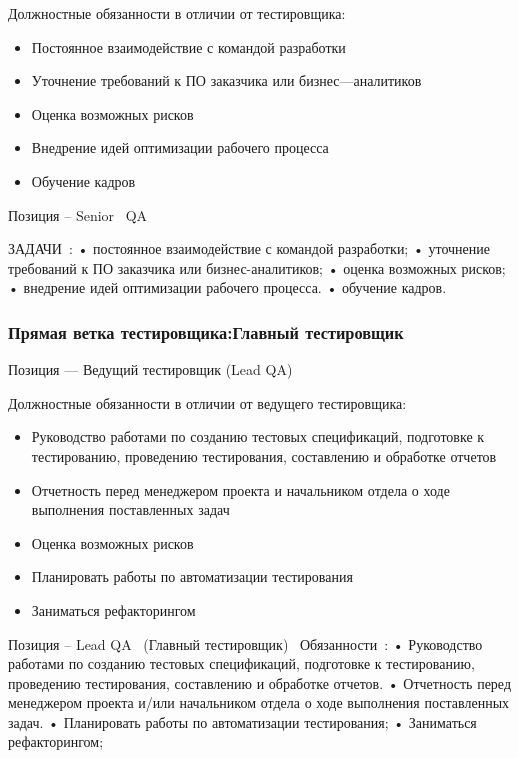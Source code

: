 \documentclass{../industrial-development}
\begin{document}
{\begin{frame}
\begin{block}{}
Должностные обязанности в отличии от тестировщика: 
  \end{block}
  \begin{itemize}
  \item Постоянное взаимодействие с командой разработки
  \item Уточнение требований к ПО заказчика или бизнес---аналитиков
  \item Оценка возможных рисков
 \item Внедрение идей оптимизации рабочего процесса
 \item Обучение кадров
  \end{itemize}
\end{frame}

\lecturenotes
Позиция – Senior~\cite{hh} QA~\cite{itcf}

ЗАДАЧИ~\cite{rab}:
•	постоянное взаимодействие с командой разработки;
•	уточнение требований к ПО заказчика или бизнес-аналитиков;
•	оценка возможных рисков;
•	внедрение идей оптимизации рабочего процесса.
•	обучение кадров.


\begin{frame} \frametitle{Прямая ветка тестировщика:Главный тестировщик}
 \begin{block}{}
  \alert{Позиция --- Ведущий тестировщик (Lead QA)}

Должностные обязанности в отличии от ведущего тестировщика: 
  \end{block}
  \begin{itemize}
  \item Руководство работами по созданию тестовых спецификаций, подготовке к тестированию, проведению тестирования, составлению и обработке отчетов
  \item Отчетность перед менеджером проекта и начальником отдела о ходе выполнения поставленных задач
  \item Оценка возможных рисков
 \item Планировать работы по автоматизации тестирования
 \item Заниматься рефакторингом
  \end{itemize}
\end{frame}

\lecturenotes
Позиция – Lead QA~\cite{hh} (Главный тестировщик)~\cite{itcf}
Обязанности~\cite{rab}:
•	Руководство работами по созданию тестовых спецификаций, подготовке к тестированию, проведению тестирования, составлению и обработке отчетов.
•	Отчетность перед менеджером проекта и/или начальником отдела о ходе выполнения поставленных задач.
•	Планировать работы по автоматизации тестирования;
•	Заниматься рефакторингом;


}
\end{document}
